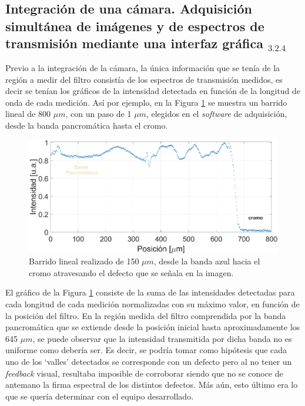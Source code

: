 

\singlespacing
\subsection{Integración de una cámara. Adquisición simultánea de imágenes y de espectros de transmisión mediante una interfaz gráfica \href{https://github.com/jrr1984/defectsGUI}{\faGithub$_{3.2.4}$}}
\label{sec:camwebgui}

\hspace{0.5cm}Previo a la integración de la cámara, la única información que se tenía de la región a medir del filtro consistía de los espectros de transmisión medidos, es decir se tenían los gráficos de la intensidad detectada en función de la longitud de onda de cada medición. Así por ejemplo, en la Figura \ref{fig:muchossi} se muestra un barrido lineal de  800 $\mu m$, con un paso de 1 $\mu m$, elegidos en el \textit{software} de adquisición, desde la banda pancromática hasta el cromo. 

 \begin{figure}[H]
	\centering
	\includegraphics[width=1.0\textwidth]{Figs/microespectrometro/defectosmuchossinvis.png}
	\caption{Barrido lineal realizado de 150 $\mu m$, desde la banda azul hacia el cromo atravesando el defecto que se señala en la imagen.}
	\label{fig:muchossi}
\end{figure}

El gráfico de la Figura \ref{fig:muchossi} consiste de la suma de las intensidades detectadas para cada longitud de cada medición normalizadas con su máximo valor, en función de la posición del filtro. En la región medida del filtro comprendida por la banda pancromática que se extiende desde la posición inicial hasta aproximadamente los 645 $\mu m$, se puede observar que la intensidad transmitida por dicha banda no es uniforme como debería ser. Es decir, se podría tomar como hipótesis que cada uno de los `valles' detectados se corresponde con un defecto pero al no tener un \textit{feedback} visual, resultaba imposible de corroborar siendo que no se conoce de antemano la firma espectral de los distintos defectos. Más aún, esto último era lo que se quería determinar con el equipo desarrollado.  

